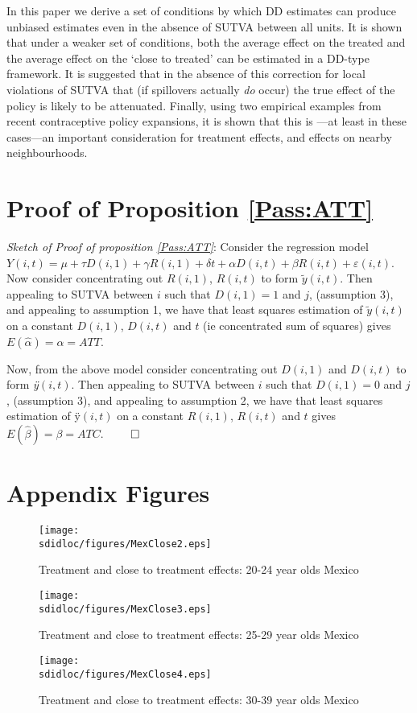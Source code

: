 In this paper we derive a set of conditions by which DD estimates can produce 
unbiased estimates even in the absence of SUTVA between all units.  It is shown
that under a weaker set of conditions, both the average effect on the treated
and the average effect on the `close to treated' can be estimated in a DD-type
framework.  It is suggested that in the absence of this correction for local 
violations of SUTVA that (if spillovers actually \emph{do} occur) the true 
effect of the policy is likely to be attenuated.  Finally, using two empirical 
examples from recent contraceptive policy expansions, it is shown that this is%
---at least in these cases---an important consideration for treatment effects, 
and effects on nearby neighbourhoods.


\newpage

\appendix
\section{Proof of Proposition \ref{Pass:ATT}}
\emph{Sketch of Proof of proposition \ref{Pass:ATT}}: Consider the regression 
model $Y(i,t)=\mu+\tau D(i,1) + \gamma R(i,1) + \delta t + \alpha D(i,t) + 
\beta R(i,t) + \varepsilon(i,t)$.  Now consider concentrating out $R(i,1)$, 
$R(i,t)$ to form $\tilde{y}(i,t)$.  Then appealing to SUTVA between $i$ such 
that $D(i,1)=1$ and $j$, (assumption 3), and appealing to assumption 1, we have 
that least squares estimation of $\tilde{y}(i,t)$ on a constant $D(i,1)$,
$D(i,t)$ and $t$ (ie concentrated sum of squares) gives
$E(\hat\alpha)=\alpha=ATT$.  


Now, from the above model consider concentrating out $D(i,1)$ and $D(i,t)$
to form \emph{\"{y}}$(i,t)$.  Then appealing to SUTVA between $i$ such 
that $D(i,1)=0$ and $j$, (assumption 3), and appealing to assumption 2, we 
have that least squares estimation of \"{y}$(i,t)$ on a constant $R(i,1)$,
$R(i,t)$ and $t$ gives $E(\hat\beta)=\beta=ATC$. $\qed$

\clearpage

\section{Appendix Figures}
\label{Sscn:Agraphs}
\begin{figure}[htpb!]
\texttt{[image: \\sdidloc/figures/MexClose2.eps]}
\caption{Treatment and close to treatment effects: 20-24 year olds Mexico}
\end{figure}
\begin{figure}[htpb!]
\texttt{[image: \\sdidloc/figures/MexClose3.eps]}
\caption{Treatment and close to treatment effects: 25-29 year olds Mexico}
\end{figure}
\begin{figure}[htpb!]
\texttt{[image: \\sdidloc/figures/MexClose4.eps]}
\caption{Treatment and close to treatment effects: 30-39 year olds Mexico}
\end{figure}

